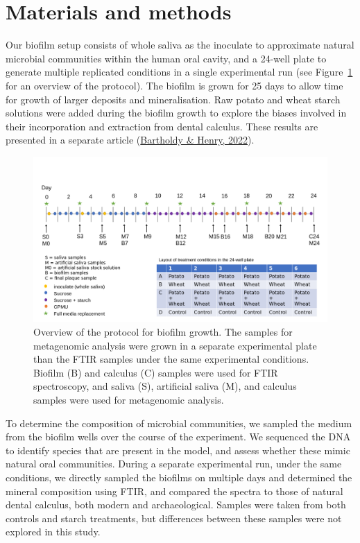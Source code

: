 \documentclass[
  letterpaper,
]{book}
\begin{document}
\hypertarget{materials-and-methods}{%
\section{Materials and methods}\label{materials-and-methods}}

Our biofilm setup consists of whole saliva as the inoculate to
approximate natural microbial communities within the human oral cavity,
and a 24-well plate to generate multiple replicated conditions in a
single experimental run (see Figure~\ref{fig-protocol} for an overview
of the protocol). The biofilm is grown for 25 days to allow time for
growth of larger deposits and mineralisation. Raw potato and wheat
starch solutions were added during the biofilm growth to explore the
biases involved in their incorporation and extraction from dental
calculus. These results are presented in a separate article
(\protect\hyperlink{ref-bartholdyInvestigatingBiases2022}{Bartholdy \&
Henry, 2022}).

\begin{figure}

{\centering \includegraphics{figures/Exp_protocol.png}

}

\caption{\label{fig-protocol}Overview of the protocol for biofilm
growth. The samples for metagenomic analysis were grown in a separate
experimental plate than the FTIR samples under the same experimental
conditions. Biofilm (B) and calculus (C) samples were used for FTIR
spectroscopy, and saliva (S), artificial saliva (M), and calculus
samples were used for metagenomic analysis.}

\end{figure}

To determine the composition of microbial communities, we sampled the
medium from the biofilm wells over the course of the experiment. We
sequenced the DNA to identify species that are present in the model, and
assess whether these mimic natural oral communities. During a separate
experimental run, under the same conditions, we directly sampled the
biofilms on multiple days and determined the mineral composition using
FTIR, and compared the spectra to those of natural dental calculus, both
modern and archaeological. Samples were taken from both controls and
starch treatments, but differences between these samples were not
explored in this study.
\end{document}
